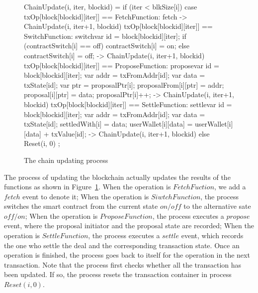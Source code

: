 \documentclass{KERauth}
\begin{document}
\begin{figure}[!h]
\begin{center}
\begin{boxedverbatim}
ChainUpdate(i, iter, blockid) = 
  if (iter < blkSize[i]) {
    case {
      txOp[block[blockid][iter]] == FetchFunction:
        fetch ->
        ChainUpdate(i, iter+1, blockid)
      txOp[block[blockid][iter]] == SwitchFunction:
        switch{var id = block[blockid][iter];
                 if (contractSwitch[i] == off) {contractSwitch[i] = on;} 
                 else {contractSwitch[i] = off;}} ->
        ChainUpdate(i, iter+1, blockid)
      txOp[block[blockid][iter]] == ProposeFunction:
        propose{var id = block[blockid][iter];
                var addr = txFromAddr[id];
                var data = txState[id];
                var ptr = proposalPtr[i];
                proposalFrom[i][ptr] = addr;
                proposal[i][ptr] = data;
                proposalPtr[i]++; } ->
        ChainUpdate(i, iter+1, blockid)
      txOp[block[blockid][iter]] == SettleFunction:
        settle{var id = block[blockid][iter];
               var addr = txFromAddr[id];
               var data = txState[id];
               settledWith[i] = data;
               userWallet[i][data] = userWallet[i][data] + txValue[id];	} ->
        ChainUpdate(i, iter+1, blockid)}} 
  else {Reset(i, 0)	};
\end{boxedverbatim}
\end{center}
\caption{The chain updating process}\label{fig:chainupdate}
\end{figure}

The process of updating the blockchain actually updates the results of the functions as shown in Figure~\ref{fig:chainupdate}. When the operation is $FetchFuction$, we add a $fetch$ event to denote it; When the operation is $SiwtchFunction$, the process switches the smart contract from the current state $on/off$ to the alternative sate $off/on$; When the operation is $ProposeFunction$, the process executes a $propose$ event, where the proposal initiator and the proposal state are recorded; When the operation is $SettleFunction$, the process executes a $settle$ event, which records the one who settle the deal and the corresponding transaction state. Once an operation is finished, the process goes back to itself for the operation in the next transaction. Note that the process first checks whether all the transaction has been updated. If so, the process resets the transaction container in process $Reset(i, 0)$. 
\end{document}
